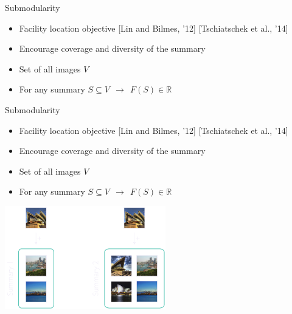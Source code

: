 \documentclass[mathserif]{beamer}
\newcommand{\qcite}[1]{{\scriptsize\color{col2}[#1]}}
\begin{document}
\begin{frame}{Submodularity}
\vspace{0.5em}
\begin{itemize}
\item<1-> Facility location objective \qcite{Lin and Bilmes, '12} \qcite{Tschiatschek et al., '14}
\vspace{0.5em}
\item<2-> Encourage coverage and diversity of the summary
\vspace{0.5em}
\item<3-> Set of all images $V$
\vspace{0.5em}
\item<4-> For any summary $S \subseteq V\ \ \longrightarrow\ \ F(S) \in \mathbb{R}$
\end{itemize}

\vspace{0.5em}
\centering
{}
\end{frame}

\begin{frame}{Submodularity}
\vspace{0.5em}
\begin{itemize}
\item Facility location objective \qcite{Lin and Bilmes, '12} \qcite{Tschiatschek et al., '14}
\vspace{0.5em}
\item Encourage coverage and diversity of the summary
\vspace{0.5em}
\item Set of all images $V$
\vspace{0.5em}
\item For any summary $S \subseteq V\ \ \longrightarrow\ \ F(S) \in \mathbb{R}$
\end{itemize}

\vspace{0.5em}
\centering
\includegraphics[width=2.75in]{figures/submod_2.pdf}
\end{frame}
\end{document}
